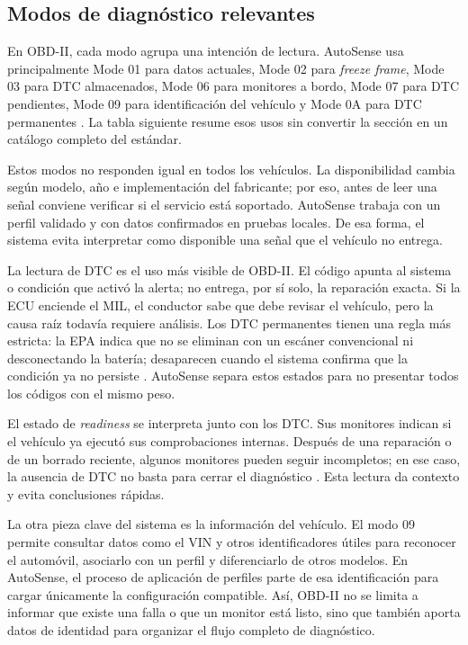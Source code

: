 \documentclass[12pt,letterpaper]{report}
\begin{document}
\subsection{Modos de diagnóstico relevantes}

En OBD-II, cada modo agrupa una intención de lectura. AutoSense usa principalmente Mode 01 para datos actuales, Mode 02 para \textit{freeze frame}, Mode 03 para DTC almacenados, Mode 06 para monitores a bordo, Mode 07 para DTC pendientes, Mode 09 para identificación del vehículo y Mode 0A para DTC permanentes \cite{sae2025_j1979_diagnostic_test_modes,epa2013_obd_readiness_best_practices}. La tabla siguiente resume esos usos sin convertir la sección en un catálogo completo del estándar.

Estos modos no responden igual en todos los vehículos. La disponibilidad cambia según modelo, año e implementación del fabricante; por eso, antes de leer una señal conviene verificar si el servicio está soportado. AutoSense trabaja con un perfil validado y con datos confirmados en pruebas locales. De esa forma, el sistema evita interpretar como disponible una señal que el vehículo no entrega.

La lectura de DTC es el uso más visible de OBD-II. El código apunta al sistema o condición que activó la alerta; no entrega, por sí solo, la reparación exacta. Si la ECU enciende el MIL, el conductor sabe que debe revisar el vehículo, pero la causa raíz todavía requiere análisis. Los DTC permanentes tienen una regla más estricta: la EPA indica que no se eliminan con un escáner convencional ni desconectando la batería; desaparecen cuando el sistema confirma que la condición ya no persiste \cite{epa2013_obd_readiness_best_practices}. AutoSense separa estos estados para no presentar todos los códigos con el mismo peso.

El estado de \textit{readiness} se interpreta junto con los DTC. Sus monitores indican si el vehículo ya ejecutó sus comprobaciones internas. Después de una reparación o de un borrado reciente, algunos monitores pueden seguir incompletos; en ese caso, la ausencia de DTC no basta para cerrar el diagnóstico \cite{epa2013_obd_readiness_best_practices}. Esta lectura da contexto y evita conclusiones rápidas.

La otra pieza clave del sistema es la información del vehículo. El modo 09 permite consultar datos como el VIN y otros identificadores útiles para reconocer el automóvil, asociarlo con un perfil y diferenciarlo de otros modelos. En AutoSense, el proceso de aplicación de perfiles parte de esa identificación para cargar únicamente la configuración compatible. Así, OBD-II no se limita a informar que existe una falla o que un monitor está listo, sino que también aporta datos de identidad para organizar el flujo completo de diagnóstico.
\end{document}
